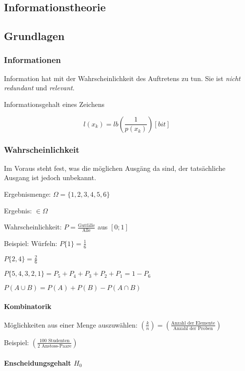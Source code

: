\begin{multicols}{2}
\section{Informationstheorie}


\subsection{Grundlagen}

\subsubsection{Informationen}
	Information hat mit der Wahrscheinlichkeit des Auftretens zu tun. Sie ist \emph{nicht redundant} und  \emph{relevant}.
	
	Informationsgehalt eines Zeichens
	
	\[
		l(x_k) = lb\left(\frac{1}{p(x_k)}\right) [bit]
	\]

\subsubsection{Wahrscheinlichkeit}
	Im Voraus steht fest, was die möglichen Ausgäng da sind, der tatsächliche Ausgang ist jedoch unbekannt.

	Ergebnismenge: $\Omega = \{1,2,3,4,5,6\}$
	
	Ergebnis: $ \in \Omega$
	
	Wahrscheinlichkeit: 	$P = \frac{\text{Gutfälle}}{\text{Alle}}$ aus $[0;1]$
	
	Beispiel: Würfeln:
	$P\{1\} = \frac{1}{6}$
	
	$P\{2,4\} = \frac{2}{6}$
	
	$P\{5,4,3,2,1\} = P_5 + P_4 + P_3 + P_2 + P_1 = 1 - P_6$
	
	$P(A \cup B) = P(A) + P(B) - P(A \cap B)$
	
	\paragraph{Kombinatorik} Möglichkeiten aus einer Menge auszuwählen: $\left(\frac{k}{n} \right) = \left(\frac{\text{Anzahl der Elemente}}{\text{Anzahl der Proben}} \right)$
	
	Beispiel: $\left(\frac{100 \text{ Studenten}}{2 \text{ Anstoss-Paare}} \right)$
	
	
	\paragraph{Enscheidungsgehalt $H_0$}
	

\end{multicols}
